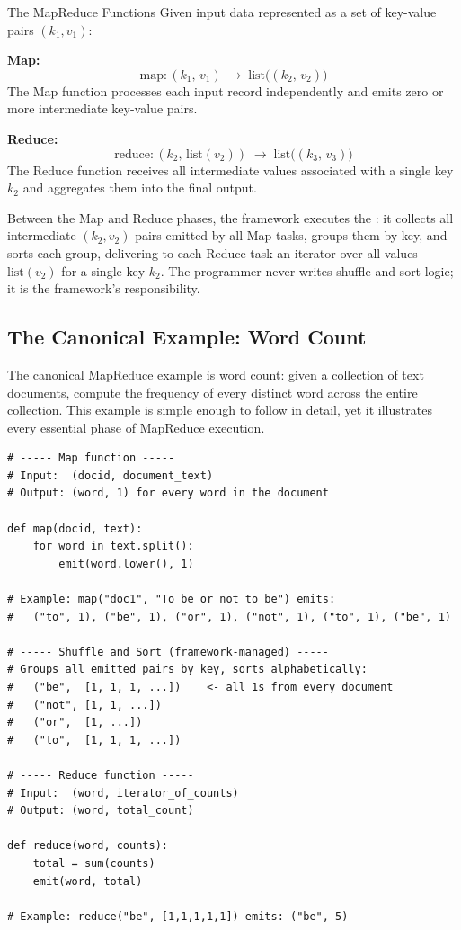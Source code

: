 \begin{defbox}{The MapReduce Functions}
Given input data represented as a set of key-value pairs $(k_1, v_1)$:

\medskip
\noindent\textbf{Map:}
\[
\text{map} : (k_1,\, v_1) \;\longrightarrow\; \text{list}\bigl((k_2,\, v_2)\bigr)
\]
The Map function processes each input record independently and emits
zero or more intermediate key-value pairs.

\medskip
\noindent\textbf{Reduce:}
\[
\text{reduce} : (k_2,\, \text{list}(v_2)) \;\longrightarrow\; \text{list}\bigl((k_3,\, v_3)\bigr)
\]
The Reduce function receives all intermediate values associated with
a single key $k_2$ and aggregates them into the final output.
\end{defbox}

Between the Map and Reduce phases, the framework executes the
: it collects all intermediate $(k_2, v_2)$
pairs emitted by all Map tasks, groups them by key, and sorts each
group, delivering to each Reduce task an iterator over all values
$\text{list}(v_2)$ for a single key $k_2$. The programmer never
writes shuffle-and-sort logic; it is the framework's responsibility.

\subsection{The Canonical Example: Word Count}
\label{subsec:word-count}

The canonical MapReduce example is word count: given a collection of
text documents, compute the frequency of every distinct word across
the entire collection. This example is simple enough to follow in
detail, yet it illustrates every essential phase of MapReduce execution.

\begin{lstlisting}[style=pseudocode, caption={MapReduce word count: Map and Reduce functions}]
# ----- Map function -----
# Input:  (docid, document_text)
# Output: (word, 1) for every word in the document

def map(docid, text):
    for word in text.split():
        emit(word.lower(), 1)

# Example: map("doc1", "To be or not to be") emits:
#   ("to", 1), ("be", 1), ("or", 1), ("not", 1), ("to", 1), ("be", 1)

# ----- Shuffle and Sort (framework-managed) -----
# Groups all emitted pairs by key, sorts alphabetically:
#   ("be",  [1, 1, 1, ...])    <- all 1s from every document
#   ("not", [1, 1, ...])
#   ("or",  [1, ...])
#   ("to",  [1, 1, 1, ...])

# ----- Reduce function -----
# Input:  (word, iterator_of_counts)
# Output: (word, total_count)

def reduce(word, counts):
    total = sum(counts)
    emit(word, total)

# Example: reduce("be", [1,1,1,1,1]) emits: ("be", 5)
\end{lstlisting}

